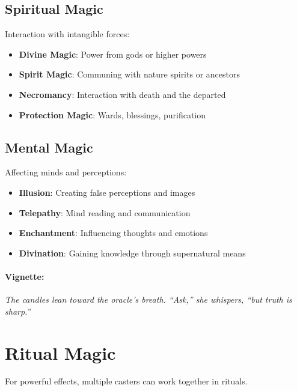 \begin{multicols}{2}
\subsection*{Spiritual Magic} 
Interaction with intangible forces:
\begin{itemize}
\item \textbf{Divine Magic}: Power from gods or higher powers
\item \textbf{Spirit Magic}: Communing with nature spirits or ancestors
\item \textbf{Necromancy}: Interaction with death and the departed
\item \textbf{Protection Magic}: Wards, blessings, purification
\end{itemize}

\subsection*{Mental Magic} 
Affecting minds and perceptions:
\begin{itemize}
\item \textbf{Illusion}: Creating false perceptions and images
\item \textbf{Telepathy}: Mind reading and communication
\item \textbf{Enchantment}: Influencing thoughts and emotions
\item \textbf{Divination}: Gaining knowledge through supernatural means
\end{itemize}

\paragraph{Vignette:}
\emph{The candles lean toward the oracle’s breath. “Ask,” she whispers, “but truth is sharp.”}

\section{Ritual Magic} 

For powerful effects, multiple casters can work together in rituals.


\end{multicols}
